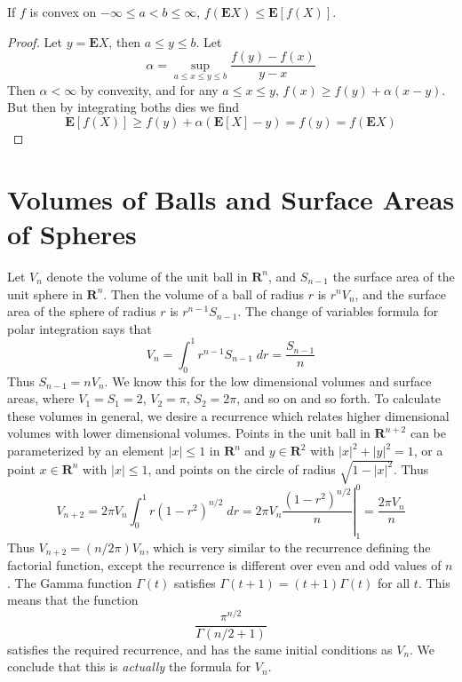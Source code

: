 \begin{theorem}
    If $f$ is convex on $-\infty \leq a < b \leq \infty$, $f(\mathbf{E}X) \leq \mathbf{E}[f(X)]$.
\end{theorem}
\begin{proof}
    Let $y = \mathbf{E}X$, then $a \leq y \leq b$. Let
    \[ \alpha = \sup_{a \leq x \leq y \leq b} \frac{f(y) - f(x)}{y - x} \]
    Then $\alpha < \infty$ by convexity, and for any $a \leq x \leq y$, $f(x) \geq f(y) + \alpha(x - y)$. But then by integrating boths dies we find
    \[ \mathbf{E}[f(X)] \geq f(y) + \alpha(\mathbf{E}[X] - y) = f(y) = f(\mathbf{E}X) \]
\end{proof}

\chapter{Volumes of Balls and Surface Areas of Spheres}

Let $V_n$ denote the volume of the unit ball in $\mathbf{R}^n$, and $S_{n-1}$ the surface area of the unit sphere in $\mathbf{R}^n$. Then the volume of a ball of radius $r$ is $r^nV_n$, and the surface area of the sphere of radius $r$ is $r^{n-1}S_{n-1}$. The change of variables formula for polar integration says that
%
\[ V_n = \int_0^1 r^{n-1}S_{n-1}\; dr = \frac{S_{n-1}}{n} \]
%
Thus $S_{n-1} = nV_n$. We know this for the low dimensional volumes and surface areas, where $V_1 = S_1 = 2$, $V_2 = \pi$, $S_2 = 2\pi$, and so on and so forth. To calculate these volumes in general, we desire a recurrence which relates higher dimensional volumes with lower dimensional volumes. Points in the unit ball in $\mathbf{R}^{n+2}$ can be parameterized by an element $|x| \leq 1$ in $\mathbf{R}^n$ and $y \in \mathbf{R}^2$ with $|x|^2 + |y|^2 = 1$, or a point $x \in \mathbf{R}^n$ with $|x| \leq 1$, and points on the circle of radius $\sqrt{1 - |x|^2}$. Thus
%
\[ V_{n+2} = 2 \pi V_n \int_0^1 r (1 - r^2)^{n/2}\; dr = 2 \pi V_n \left. \frac{(1 - r^2)^{n/2}}{n} \right|_1^0 = \frac{2 \pi V_n}{n} \]
%
Thus $V_{n+2} = (n/2\pi) V_n$, which is very similar to the recurrence defining the factorial function, except the recurrence is different over even and odd values of $n$. The Gamma function $\Gamma(t)$ satisfies $\Gamma(t+1) = (t+1) \Gamma(t)$ for all $t$. This means that the function
%
\[ \frac{\pi^{n/2}}{\Gamma(n/2 + 1)} \]
%
satisfies the required recurrence, and has the same initial conditions as $V_n$. We conclude that this is {\it actually} the formula for $V_n$.

